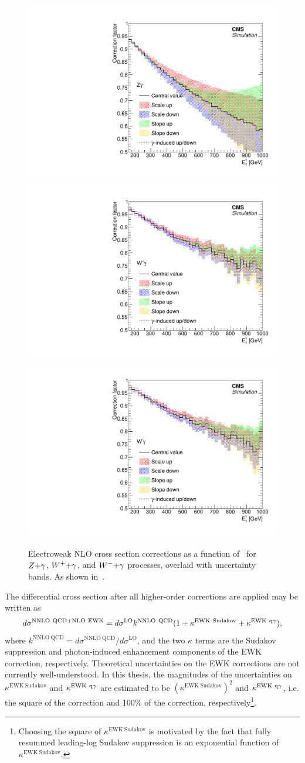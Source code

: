 \begin{figure}[htbp]
  \centering
  \includegraphics[width=0.48\linewidth]{Figures/exo16053/Figure_012-a}
  \includegraphics[width=0.48\linewidth]{Figures/exo16053/Figure_012-b}
  \includegraphics[width=0.48\linewidth]{Figures/exo16053/Figure_012-c}
  \caption{
    Electroweak NLO cross section corrections as a function of \pTgamma\ for $Z{+}\gamma$, $W^\mathrm{+}{+}\gamma$, and $W^\mathrm{-}{+}\gamma$
    processes, overlaid with uncertainty bands. As shown in~\cite{ref:JHEP02(2019)074}.
  }
  \label{fig:ewk_correction}
\end{figure}

The differential cross section after all higher-order corrections are applied may be written as
\begin{equation}
  d\sigma^{\mathrm{NNLO\ QCD}+\mathrm{NLO\ EWK}} = d\sigma^{\mathrm{LO}} k^{\mathrm{NNLO\ QCD}} (1 + \kappa^{\mathrm{EWK\ Sudakov}} + \kappa^{\mathrm{EWK\ \Pq\Pgamma}}),
\end{equation}
where $k^{\mathrm{NNLO\ QCD}} = d\sigma^{\mathrm{NNLO\ QCD}} / d\sigma^{\mathrm{LO}}$, and the two $\kappa$
terms are the Sudakov suppression and photon-induced enhancement components of the EWK
correction, respectively. Theoretical uncertainties on the EWK corrections are not currently well-understood. In this thesis,
the magnitudes of the uncertainties on $\kappa^{\mathrm{EWK\ Sudakov}}$ and $\kappa^{\mathrm{EWK\ \Pq\Pgamma}}$ are estimated
to be $(\kappa^{\mathrm{EWK\ Sudakov}})^2$ and $\kappa^{\mathrm{EWK\ \Pq\Pgamma}}$, i.e. the square of
the correction and 100\% of the correction, respectively\footnote{Choosing the square of $\kappa^{\mathrm{EWK\ Sudakov}}$ is motivated by the fact
that fully resummed leading-log Sudakov suppression is an exponential function of $\kappa^{\mathrm{EWK\ Sudakov}}$.}.

